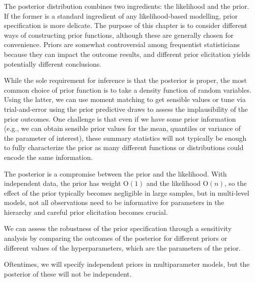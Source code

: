 \documentclass[
  11pt,
  letterpaper,
]{scrbook}
\theoremstyle{definition}
\theoremstyle{plain}
\theoremstyle{plain}
\theoremstyle{plain}
\theoremstyle{definition}
\theoremstyle{definition}
\theoremstyle{plain}
\theoremstyle{plain}
\theoremstyle{remark}
\begin{document}
The posterior distribution combines two ingredients: the likelihood and
the prior. If the former is a standard ingredient of any
likelihood-based modelling, prior specification is more delicate. The
purpose of this chapter is to consider different ways of constructing
prior functions, although these are generally chosen for convenience.
Priors are somewhat controversial among frequentist statisticians
because they can impact the outcome results, and different prior
elicitation yields potentially different conclusions.

While the sole requirement for inference is that the posterior is
proper, the most common choice of prior function is to take a density
function of random variables. Using the latter, we can use moment
matching to get sensible values or tune via trial-and-error using the
prior predictive draws to assess the implausibility of the prior
outcomes. One challenge is that even if we have some prior information
(e.g., we can obtain sensible prior values for the mean, quantiles or
variance of the parameter of interest), these summary statistics will
not typically be enough to fully characterize the prior as many
different functions or distributions could encode the same information.

The posterior is a compromise between the prior and the likelihood. With
independent data, the prior has weight \(\mathrm{O}(1)\) and the
likelihood \(\mathrm{O}(n)\), so the effect of the prior typically
becomes negligible in large samples, but in multi-level models, not all
observations need to be informative for parameters in the hierarchy and
careful prior elicitation becomes crucial.

We can assess the robustness of the prior specification through a
sensitivity analysis by comparing the outcomes of the posterior for
different priors or different values of the hyperparameters, which are
the parameters of the prior.

Oftentimes, we will specify independent priors in multiparameter models,
but the posterior of these will not be independent.
\end{document}
